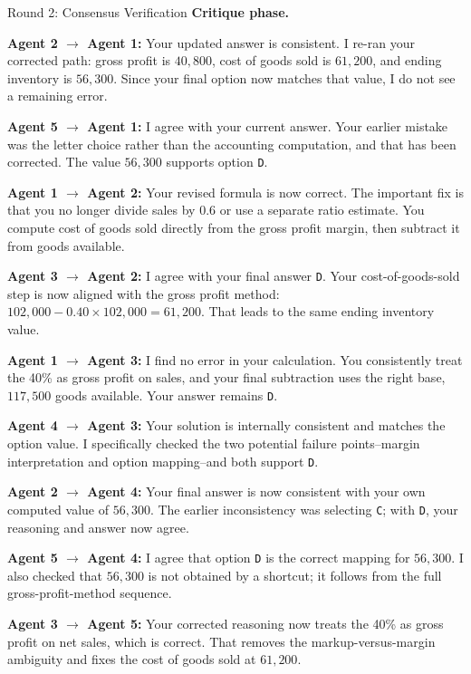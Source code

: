 \begin{roundbox}{Round 2: Consensus Verification}
\textbf{Critique phase.}

\textbf{Agent 2 $\rightarrow$ Agent 1:} Your updated answer is consistent. I re-ran your corrected path: gross profit is $40{,}800$, cost of goods sold is $61{,}200$, and ending inventory is $56{,}300$. Since your final option now matches that value, I do not see a remaining error.

\textbf{Agent 5 $\rightarrow$ Agent 1:} I agree with your current answer. Your earlier mistake was the letter choice rather than the accounting computation, and that has been corrected. The value $56{,}300$ supports option \texttt{D}.

\textbf{Agent 1 $\rightarrow$ Agent 2:} Your revised formula is now correct. The important fix is that you no longer divide sales by $0.6$ or use a separate ratio estimate. You compute cost of goods sold directly from the gross profit margin, then subtract it from goods available.

\textbf{Agent 3 $\rightarrow$ Agent 2:} I agree with your final answer \texttt{D}. Your cost-of-goods-sold step is now aligned with the gross profit method: $102{,}000-0.40\times102{,}000=61{,}200$. That leads to the same ending inventory value.

\textbf{Agent 1 $\rightarrow$ Agent 3:} I find no error in your calculation. You consistently treat the 40\% as gross profit on sales, and your final subtraction uses the right base, $117{,}500$ goods available. Your answer remains \texttt{D}.

\textbf{Agent 4 $\rightarrow$ Agent 3:} Your solution is internally consistent and matches the option value. I specifically checked the two potential failure points--margin interpretation and option mapping--and both support \texttt{D}.

\textbf{Agent 2 $\rightarrow$ Agent 4:} Your final answer is now consistent with your own computed value of $56{,}300$. The earlier inconsistency was selecting \texttt{C}; with \texttt{D}, your reasoning and answer now agree.

\textbf{Agent 5 $\rightarrow$ Agent 4:} I agree that option \texttt{D} is the correct mapping for $56{,}300$. I also checked that $56{,}300$ is not obtained by a shortcut; it follows from the full gross-profit-method sequence.

\textbf{Agent 3 $\rightarrow$ Agent 5:} Your corrected reasoning now treats the 40\% as gross profit on net sales, which is correct. That removes the markup-versus-margin ambiguity and fixes the cost of goods sold at $61{,}200$.


\end{roundbox}

